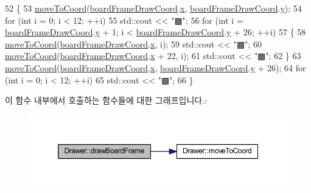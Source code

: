 \begin{DoxyCode}
52     \{
53         \mbox{\hyperlink{class_drawer_ac1a96e007c07cab2e36a7c78484ee9a6}{moveToCoord}}(\mbox{\hyperlink{tetris__drawer_8h_a4dcd1769680ae6c150a2285edfeb9e1f}{boardFrameDrawCoord}}.\mbox{\hyperlink{struct_coord_a696eaa744360fc791d0e3b331c549dbe}{x}}, 
      \mbox{\hyperlink{tetris__drawer_8h_a4dcd1769680ae6c150a2285edfeb9e1f}{boardFrameDrawCoord}}.\mbox{\hyperlink{struct_coord_a214166cca70cef7dda9201689c3e81ab}{y}});
54         \textcolor{keywordflow}{for} (\textcolor{keywordtype}{int} i = 0; i < 12; ++i)
55             std::cout << \textcolor{stringliteral}{"▩"};
56         \textcolor{keywordflow}{for} (\textcolor{keywordtype}{int} i = \mbox{\hyperlink{tetris__drawer_8h_a4dcd1769680ae6c150a2285edfeb9e1f}{boardFrameDrawCoord}}.\mbox{\hyperlink{struct_coord_a214166cca70cef7dda9201689c3e81ab}{y}} + 1; i < 
      \mbox{\hyperlink{tetris__drawer_8h_a4dcd1769680ae6c150a2285edfeb9e1f}{boardFrameDrawCoord}}.\mbox{\hyperlink{struct_coord_a214166cca70cef7dda9201689c3e81ab}{y}} + 26; ++i)
57         \{
58             \mbox{\hyperlink{class_drawer_ac1a96e007c07cab2e36a7c78484ee9a6}{moveToCoord}}(\mbox{\hyperlink{tetris__drawer_8h_a4dcd1769680ae6c150a2285edfeb9e1f}{boardFrameDrawCoord}}.\mbox{\hyperlink{struct_coord_a696eaa744360fc791d0e3b331c549dbe}{x}}, i);
59             std::cout << \textcolor{stringliteral}{"▩"};
60             \mbox{\hyperlink{class_drawer_ac1a96e007c07cab2e36a7c78484ee9a6}{moveToCoord}}(\mbox{\hyperlink{tetris__drawer_8h_a4dcd1769680ae6c150a2285edfeb9e1f}{boardFrameDrawCoord}}.\mbox{\hyperlink{struct_coord_a696eaa744360fc791d0e3b331c549dbe}{x}} + 22, i);
61             std::cout << \textcolor{stringliteral}{"▩"};
62         \}
63         \mbox{\hyperlink{class_drawer_ac1a96e007c07cab2e36a7c78484ee9a6}{moveToCoord}}(\mbox{\hyperlink{tetris__drawer_8h_a4dcd1769680ae6c150a2285edfeb9e1f}{boardFrameDrawCoord}}.\mbox{\hyperlink{struct_coord_a696eaa744360fc791d0e3b331c549dbe}{x}}, 
      \mbox{\hyperlink{tetris__drawer_8h_a4dcd1769680ae6c150a2285edfeb9e1f}{boardFrameDrawCoord}}.\mbox{\hyperlink{struct_coord_a214166cca70cef7dda9201689c3e81ab}{y}} + 26);
64         \textcolor{keywordflow}{for} (\textcolor{keywordtype}{int} i = 0; i < 12; ++i)
65             std::cout << \textcolor{stringliteral}{"▩"};
66     \}
\end{DoxyCode}
이 함수 내부에서 호출하는 함수들에 대한 그래프입니다.\+:
\nopagebreak
\begin{figure}[H]
\begin{center}
\leavevmode
\includegraphics[width=350pt]{class_drawer_a72d01f53fc2c5ff15763dcd76a9b9395_cgraph}
\end{center}
\end{figure}
